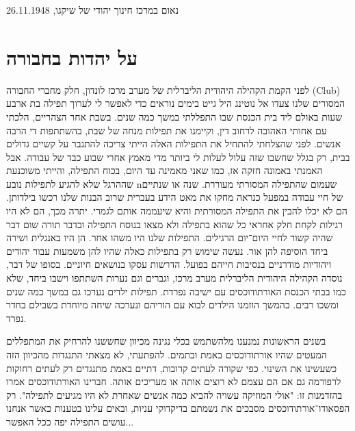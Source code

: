 \documentclass[14pt, article, extrafontsizes, twopage, a4paper]{memoir}
\newcommand{\attr}[1]{
{\raggedright\smaller#1}
}
\begin{document}
\attr{נאום במרכז חינוך יהודי של שיקגו, 26.11.1948}

\pagebreak
\chapter{על יהדות בחבורה}

לפני הקמת הקהילה היהודית הליברלית של מערב מרכז לונדון, חלק מחברי החבורה (\textenglish{Club}) המסורים שלנו צעדו אל נוטינג היל גייט בימים נוראים כדי לאפשר לי לערוך תפילה בת ארבע שעות באולם ליד בית הכנסת שבו התפללתי במשך כמה שנים. בשבת אחר הצהריים, הלכתי עם אחותי האהובה לרחוב דין, וקיימנו את תפילות מנחה של שבת, בהשתתפות די הרבה אנשים. לפני שהצלחתי להתחיל את התפילות האלה הייתי צריכה להתגבר על קשיים גדולים בבית, רק בגלל שחשבו שזה עלול לעלות לי ביותר מדי מאמץ אחרי שבוע כבד של עבודה. אבל האמנתי באמונה חזקה אז, כמו שאני מאמינה עד היום, בכוח התפילה, והייתי משוכנעת שההרגל שלא להגיע לתפילות נובע nשעמום שהתפילה המסורתי מעוררת. שנה או שנתיים של חיי עבודה  במפעל כנראה מחקו את מאט הידע בעברית שרוב הבנות שלנו רכשו בילדותן. הם לא יכלו להבין את התפילה המסורתית והיא שיעממה אותם לגמרי. יתרה מכך, הם לא היו רגילות לקחת חלק אחראי כל שהוא בתפילה ולא מצאו בנוסח התפילה ובדבר תורה שום דבר שהיה קשור לחיי היום־יום הרגילים. התפילות שלנו היו משהו אחר. הן היו באנגלית ושירה ביחד הוסיפה להן אור. נעשה שימוש רק בתפילות כאלה שהיו להן משמעות עבור יהודים ויהודיות מודרניים בנסיבות חייהם בפועל. הדרשות עסקו בנושאים חיוניים. בסופו של דבר, נוסדה הקהילה היהודית הליברלית מערב מרכז, וגברים וגם נערות השתתפו וישבו ביחד, שלא כמו בבתי הכנסת האורתודוכסים  עם ישיבה נפרדת. תפילות ילדים נערכו גם במשך כמה שנים ומשכו רבים. בהמשך הוזמנו הילדים לבוא עם הוריהם ונערכה שיחה מיוחדת בשבילם בחדר נפרד.

בשנים הראשונות נמנענו מלהשתמש בכלי נגינה מכיוון שחששנו להרחיק את המתפללים המעטים שהיו אורתודוכסים באמת ובתמים. להפתעתי, לא מצאתי התנגדות מהכיוון הזה כשעשינו את השינוי. כפי שקורה לעתים קרובות, דתיים באמת מתנגדים רק לעתים רחוקות לרפורמה גם אם הם עצמם לא רוצים אותה או מעריכים אותה. חברינו האורתודוכסים אמרו בהזדמנות זו: "אולי המוזיקה עשויה להביא כמה אנשים שאחרת לא היו מגיעים לתפילה". רק הפסאודו־אורתודוכסים מסבכים את נשמתם בדיקדוקי עניות, ובאים עלינו בטענות כאשר אנחנו עושים התפילה יפה ככל האפשר...
\end{document}
